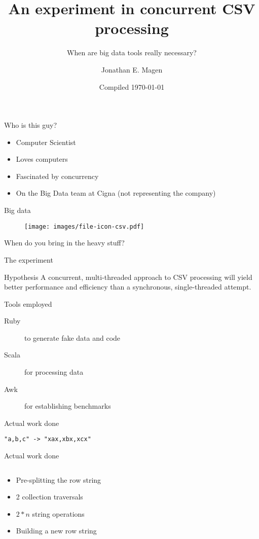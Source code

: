 \documentclass[aspectratio=169]{beamer}
\title{An experiment in concurrent CSV processing}
\subtitle{When are big data tools really necessary?}
\author{Jonathan E. Magen}
\date{Compiled \today}
\newcommand{\megatext}[1]{
  \begin{center}
    \Huge
    #1
  \end{center}
}
\begin{document}
\frame{\titlepage}

\begin{frame}{Who is this guy?}
  \begin{itemize}
  \item Computer Scientist
  \item Loves computers
  \item Fascinated by concurrency
  \item On the Big Data team at Cigna (not representing the company)
  \end{itemize}
\end{frame}


\begin{frame}
  \megatext{Big data}
\end{frame}

\begin{frame}
  \begin{figure}
    \texttt{[image: images/file-icon-csv.pdf]}
  \end{figure}
\end{frame}

\begin{frame}
  \megatext{When do you bring in the heavy stuff?}
\end{frame}

\begin{frame}{The experiment}
  \begin{block}{Hypothesis}
    A concurrent, multi-threaded approach to CSV processing will yield better performance and efficiency than a synchronous, single-threaded attempt.
  \end{block}

  \begin{block}{Tools employed}
    \begin{description}
    \item[Ruby] to generate fake data and code
    \item[Scala] for processing data
    \item[Awk] for establishing benchmarks
    \end{description}
  \end{block}
\end{frame}


\begin{frame}{Actual work done}
  \megatext{\texttt{"a,b,c" -> "xax,xbx,xcx"}}
\end{frame}


\begin{frame}[fragile]{Actual work done}
  \inputminted{scala}{snippets/process.scala}

  \begin{itemize}
    \item Pre-splitting the row string
    \item 2 collection traversals
    \item $2*n$ string operations
    \item Building a new row string
  \end{itemize}
\end{frame}
\end{document}

